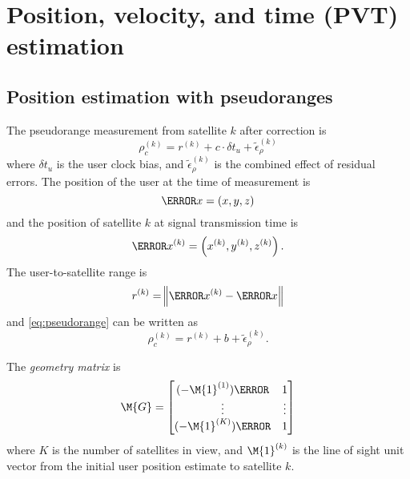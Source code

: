 \section{Position, velocity, and time (PVT) estimation}

\subsection{Position estimation with pseudoranges}
The pseudorange measurement from satellite $k$ after correction is
\begin{equation}\label{eq:pseudorange}
    \rho_c^{(k)} = r^{(k)} + c \cdot \delta t_u + \tilde{\epsilon}_\rho^{(k)}
\end{equation}
where $\delta t_u$ is the user clock bias, and $\tilde{\epsilon}_\rho^{(k)}$ is the combined effect of residual errors. The position of the user at the time of measurement is
\begin{equation}
    \V{x} = (x, y, z)
\end{equation}
and the position of satellite $k$ at signal transmission time is
\begin{equation}
    \V{x}^{(k)} = \left( x^{(k)}, y^{(k)}, z^{(k)} \right).
\end{equation}
The user-to-satellite range is
\begin{equation}
    r^{(k)} = \norm{\V{x}^{(k)} - \V{x}}
\end{equation}
and \eqref{eq:pseudorange} can be written as
\begin{equation}
    \rho_c^{(k)} = r^{(k)} + b + \tilde{\epsilon}_\rho^{(k)}.
\end{equation}

The \emph{geometry matrix} is
\begin{equation}
    \M{G}
    =
    \begin{bmatrix}
        (-\M{1}^{(1)})\T & 1     \\
        \vdots          & \vdots \\
        (-\M{1}^{(K)})\T & 1
    \end{bmatrix}
\end{equation}
where $K$ is the number of satellites in view, and $\M{1}^{(k)}$ is the line of sight unit vector from the initial user position estimate to satellite $k$.

